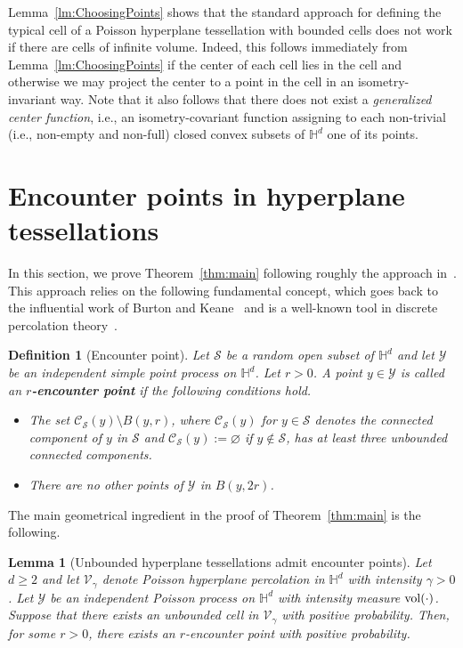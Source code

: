 \documentclass[12pt,a4paper]{article}
\newtheorem{lemma}[proposition]{Lemma}
\newtheorem{definition}[proposition]{Definition}
\theoremstyle{definition}
\begin{document}
Lemma~\ref{lm:ChoosingPoints} shows that the standard approach for defining the typical cell of a Poisson hyperplane tessellation with bounded cells does not work if there are cells of infinite volume. Indeed, this follows immediately from Lemma~\ref{lm:ChoosingPoints} if the center of each cell lies in the cell and otherwise we may project the center to a point in the cell in an isometry-invariant way. Note that it also follows that there does not exist a {\em generalized center function}, i.e., an isometry-covariant function assigning to each non-trivial (i.e., non-empty and non-full) closed convex subsets of $\mathbb H^d$ one of its points.


\section{Encounter points in hyperplane tessellations} \label{sec:mainproof}

In this section, we prove Theorem~\ref{thm:main} following roughly the approach in~\cite{BLPS99}.
This approach relies on the following fundamental concept, which goes back to the influential work of Burton and Keane~\cite{BK89} and is a well-known tool in discrete percolation theory~\cite{LP16}. 

\begin{definition}[Encounter point]
Let $\mathcal S$ be a random open subset of $\mathbb H^d$ and let $\mathcal Y$ be an independent simple point process on $\mathbb H^d$. Let $r>0$. A point $y\in \mathcal Y$ is called an {\bf $r$-encounter point} if the following conditions hold.
\begin{itemize}
\item The set $\mathcal C_{\mathcal S}(y)\setminus B(y,r)$, where $\mathcal C_{\mathcal S}(y)$ for $y\in\mathcal S$ denotes the connected component of $y$ in $\mathcal S$ and $\mathcal C_{\mathcal S}(y):=\varnothing$ if $y\notin\mathcal S$, has at least three unbounded connected components.
\item There are no other points of $\mathcal Y$ in $B(y,2r)$.
\end{itemize}
\end{definition}

The main geometrical ingredient in the proof of Theorem~\ref{thm:main} is the following.

\begin{lemma}[Unbounded hyperplane tessellations admit encounter points] \label{lem:encounter_pos_prob}
    Let $d\ge2$ and let $\mathcal V_\gamma$ denote Poisson hyperplane percolation in $\mathbb H^d$ with intensity $\gamma>0$. Let $\mathcal Y$ be an independent Poisson process on $\mathbb H^d$ with intensity measure ${\rm vol}(\cdot)$. Suppose that there exists an unbounded cell in \(\mathcal{V}_\gamma\) with positive probability. 
    Then, for some $r>0$, there exists an $r$-encounter point with positive probability.
\end{lemma}
\end{document}
